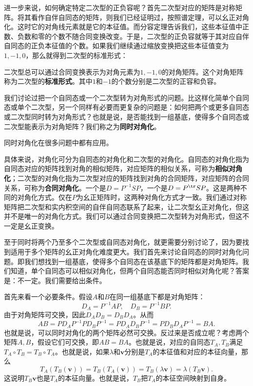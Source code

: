 \documentclass[12pt,UTF8,fontset=none]{ctexbook}
\begin{document}
进一步来说，如何确定特定二次型的正负容呢？首先二次型对应的矩阵是对称矩阵。将其看作自伴自同态的矩阵，则我们已经证明过，按照谱定理，可以幺正对角化。这时它的对角线元素就是它的本征值。而分容定理告诉我们，这些本征值中正数、负数和零的个数不随合同变换改变。于是，二次型的正负容就等于其对应自伴自同态的正负本征值的个数。如果我们继续通过缩放变换把这些本征值变为$1,-1,0$，那么就得到二次型的标准形式：
\begin{tm}
    二次型总可以通过合同变换表示为对角元素为$1,-1,0$的对角矩阵。这个对角矩阵称为二次型的\textbf{标准形式}。其中$1$和$-1$的个数分别是二次型的正容和负容。
\end{tm}

我们讨论过把一个自同态或一个二次型转为对角形式的问题。比这样化简单个自同态或单个二次型，另一个同样有必要而更复杂的问题是：如何把两个或更多自同态或二次型同时转为对角形式？也就是说，是否能找到一组基底，使得多个自同态或二次型能表示为对角矩阵？我们称之为\textbf{同时对角化}。

同时对角化在很多问题中都有应用。

具体来说，对角化可分为自同态的对角化和二次型的对角化。自同态的对角化指为自同态对应的矩阵找到对角的相似矩阵，对应矩阵的相似关系，可称为\textbf{相似对角化}；二次型的对角化指为二次型对应的矩阵找到对角的合同矩阵，对应矩阵的合同关系，可称为\textbf{合同对角化}。一个是$D = P^{-1}SP$，一个是$D = P^{\tr}SP$。这是两种不同的对角化方式。仅在$P$为幺正矩阵时，这两种对角化方式才一致。我们通过对称矩阵把二次型和实内积空间的自伴自同态联系了起来，让二次型幺正对角化，但这并不是唯一的对角化方式。我们可以通过合同变换把二次型转为对角形式，但这不一定是幺正变换。

至于同时将两个乃至多个二次型或自同态对角化，就更需要分别讨论了，因为要找到适用于多个矩阵的幺正对角化难度更大。我们首先来讨论自同态的同时对角化问题。即我们想找到一组基底，使得多个自同态在该基底下的矩阵都是对角矩阵。我们知道，单个自同态可以相似对角化，但两个自同态能否同时相似对角化呢？答案是：不一定。我们需要给出条件。

首先来看一个必要条件。假设$A$和$B$在同一组基底下都是对角矩阵：
$$ D_A = P^{-1}AP, \quad D_B = P^{-1}BP. $$
由于对角矩阵可交换，因此$D_AD_B = D_BD_A$。从而
$$ AB = P D_A P^{-1} P D_B P^{-1} = P D_A D_B P^{-1} = P D_B D_A P^{-1} = B A. $$
也就是说，可以同时对角化的两个矩阵必然可交换。反过来是否成立呢？考虑两个矩阵$A,B$，假设它们可交换，即$AB = BA$。也就是说，对应的自同态$T_A, T_B$满足$T_A\circ T_B = T_B\circ T_A$。也就是说，如果$\lambda$和$\mathbf{v}$分别是$T_A$的本征值和对应的本征向量，那么
$$ T_A(T_B(\mathbf{v})) = T_B(T_A(\mathbf{v})) = T_B(\lambda \mathbf{v}) = \lambda (T_B\mathbf{v}). $$
这说明$T_B\mathbf{v}$也是$T_A$的本征向量。也就是说，$T_B$把$T_A$的本征空间映射到自身。
\end{document}
